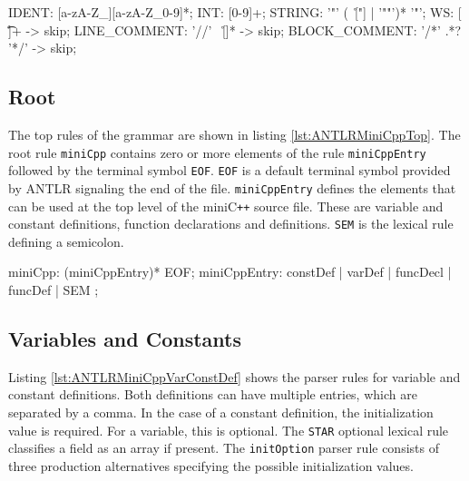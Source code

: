 \begin{AntlrCode}[float,numbers=none,caption=Terminal classes\texttt{,} whitespace and comments of the MiniC\texttt{++} ANTLR grammar., label=lst:ANTLRMiniCppTermClass]
IDENT:          [a-zA-Z_][a-zA-Z_0-9]*;
INT:            [0-9]+;
STRING:         '"' (~[\r\n"] | '""')* '"';
WS:             [ \t\n\r]+ -> skip;
LINE_COMMENT:   '//' ~[\r\n]* -> skip;
BLOCK_COMMENT:  '/*' .*? '*/' -> skip;
\end{AntlrCode}


\subsection{Root}

The top rules of the grammar are shown in listing \ref{lst:ANTLRMiniCppTop}. The root rule \texttt{miniCpp} contains zero or more elements of the rule \texttt{miniCppEntry} followed by the terminal symbol \texttt{EOF}. \texttt{EOF} is a default terminal symbol provided by ANTLR signaling the end of the file. \texttt{miniCppEntry} defines the elements that can be used at the top level of the miniC\verb|++| source file. These are variable and constant definitions, function declarations and definitions. \texttt{SEM} is the lexical rule defining a semicolon. 

\begin{AntlrCode}[float,numbers=none,caption=Top rules of the MiniC++ ANTLR grammar., label=lst:ANTLRMiniCppTop]
miniCpp:     (miniCppEntry)* EOF;
miniCppEntry:     constDef
                | varDef
                | funcDecl
                | funcDef
                | SEM
                ;
\end{AntlrCode}



\subsection{Variables and Constants}

Listing \ref{lst:ANTLRMiniCppVarConstDef} shows the parser rules for variable and constant definitions. Both definitions can have multiple entries, which are separated by a comma. In the case of a constant definition, the initialization value is required. For a variable, this is optional. The \texttt{STAR} optional lexical rule classifies a field as an array if present. The \texttt{initOption} parser rule consists of three production alternatives specifying the possible initialization values. 

